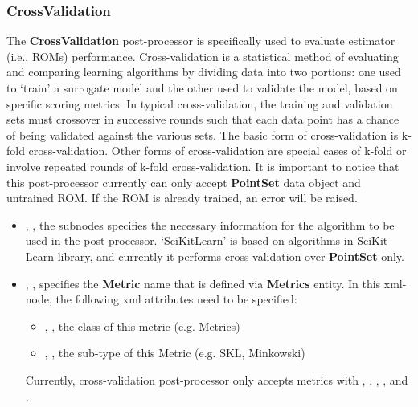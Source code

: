 \subsubsection{CrossValidation}
\label{CVPP}
The \textbf{CrossValidation} post-processor is specifically used to evaluate estimator (i.e., ROMs) performance.
Cross-validation is a statistical method of evaluating and comparing learning algorithms by dividing data into
two portions: one used to `train' a surrogate model and the other used to validate the model, based on specific
scoring metrics. In typical cross-validation, the training and validation sets must crossover in successive
rounds such that each data point has a chance of being validated against the various sets. The basic form of
cross-validation is k-fold cross-validation. Other forms of cross-validation are special cases of k-fold or involve
repeated rounds of k-fold cross-validation. \nb It is important to notice that this post-processor currently can
only accept \textbf{PointSet} data object and untrained ROM. If the ROM is already trained, an error will be raised.
%
%
\begin{itemize}
  \item {}, , the subnodes specifies the necessary information
    for the algorithm to be used in the post-processor. `SciKitLearn' is based on algorithms in SciKit-Learn
    library, and currently it performs cross-validation over \textbf{PointSet} only.
  \item {}, , specifies the \textbf{Metric} name that is defined via
    \textbf{Metrics} entity. In this xml-node, the following xml attributes need to be specified:
    \begin{itemize}
      \item {}, , the class of this metric (e.g. Metrics)
      \item {}, , the sub-type of this Metric (e.g. SKL, Minkowski)
    \end{itemize}
    \nb Currently, cross-validation post-processor only accepts  metrics with 
    , , ,
    , and .
\end{itemize}

